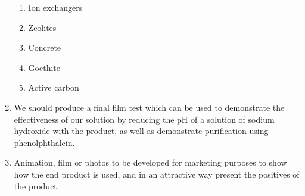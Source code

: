 \begin{enumerate}
    \begin{enumerate}
        \item Ion exchangers
        \item Zeolites
        \item Concrete
        \item Goethite
        \item Active carbon
    \end{enumerate}
    \item We should produce a final film test which can be used to demonstrate the effectiveness of our solution by reducing the pH of a solution of sodium hydroxide with the product, as well as demonstrate purification using phenolphthalein.
    \item Animation, film or photos to be developed for marketing purposes to show how the end product is used, and in an attractive way present the positives of the product.
\end{enumerate}
